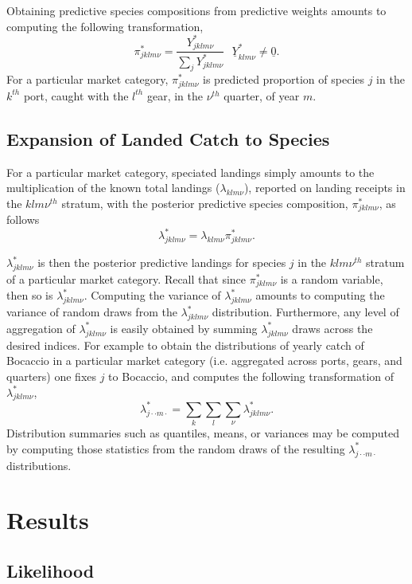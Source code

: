 \documentclass[12pt]{article}
\begin{document}
%
Obtaining predictive species compositions from predictive weights
amounts to computing the following transformation,
%
\[\pi^*_{jklm\nu} = \frac{Y^*_{jklm\nu}}{\sum_j Y^*_{jklm\nu}} ~~~ \underline{Y}^*_{klm\nu}\neq \underline{0}.\]
%
For a particular market category, \(\pi^*_{jklm\nu}\) is predicted
proportion of species \(j\) in the \(k^{th}\) port, caught with the
\(l^{th}\) gear, in the \(\nu^{th}\) quarter, of year \(m\).

%
%
\subsection{Expansion of Landed Catch to Species}\label{expansion}
%
%

%
For a particular market category, speciated landings simply amounts to
the multiplication of the known total landings (\(\lambda_{klm\nu}\)),
reported on landing receipts in the \(klm\nu^{th}\) stratum, with the
posterior predictive species composition, \(\pi^*_{jklm\nu}\), as follows
%
\[\lambda^*_{jklm\nu} = \lambda_{klm\nu}\pi^*_{jklm\nu}.\]

%
$\lambda^*_{jklm\nu}$ is then the posterior predictive landings for
species \(j\) in the \(klm\nu^{th}\) stratum of a particular market
category. Recall that since \(\pi^*_{jklm\nu}\) is a random variable,
then so is \(\lambda^*_{jklm\nu}\). Computing the variance of
\(\lambda^*_{jklm\nu}\) amounts to computing the variance of random draws from 
the \(\lambda^*_{jklm\nu}\) distribution. Furthermore, any level of aggregation 
of \(\lambda^*_{jklm\nu}\) is easily obtained by summing 
\(\lambda^*_{jklm\nu}\) draws across the desired indices. For example to obtain 
the distributions of yearly catch of Bocaccio in a particular market category 
(i.e. aggregated across ports, gears, and quarters) one fixes $j$ to 
Bocaccio, and computes the following transformation of \(\lambda^*_{jklm\nu}\),
%
\[\lambda^*_{j\cdot\cdot m\cdot} =\sum_{k}\sum_{l}\sum_{\nu}\lambda^*_{jklm\nu}.\]
%
Distribution summaries such as quantiles, means, or variances may be
computed by computing those statistics from the random draws of the
resulting \(\lambda^*_{j\cdot\cdot m\cdot}\) distributions.

%
%
\section{Results}\label{results}
%
%

%
\subsection{Likelihood}
%
\end{document}
